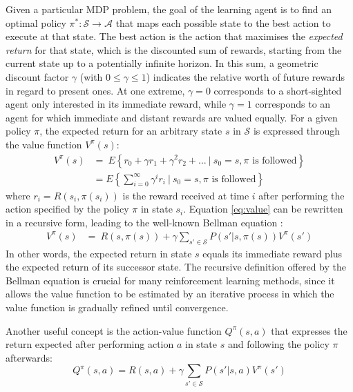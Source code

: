Given a particular MDP problem, the goal of the learning agent is to find an optimal policy $\pi^*: \mathcal{S} \rightarrow \mathcal{A}$ that maps each possible state to the best action to execute at that state.  The best action is the action that maximises the \textit{expected return} for that state, which is the discounted sum of rewards, starting from the current state up to a potentially infinite horizon.  In this sum, a geometric discount factor $\gamma$ (with $0 \leq \gamma \leq 1$) indicates the relative worth of future rewards in regard to present ones. At one extreme, $\gamma = 0$ corresponds to a short-sighted agent only interested in its immediate reward, while $\gamma=1$ corresponds to an agent for which immediate and distant rewards are valued equally. For a given policy $\pi$, the expected return for an arbitrary state $s$ in $\mathcal{S}$ is expressed through the value function $V^{\pi}(s)$:
\begin{align}
V^{\pi}(s) & = \  E \left\{ r_0 + \gamma r_1 + \gamma^2 r_2 + ... \ \big| \ s_0 = s, \pi \text{ is followed} \right\} \\
& = E \left\{\sum_{i=0}^{\infty}  \gamma^i r_{i} \ \bigg| \ s_0 = s, \pi \text{ is followed} \right\} \label{eq:value}
\end{align} 
where $r_i = R(s_i, \pi(s_i))$ is the reward received at time $i$ after performing the action specified by the policy $\pi$  in state $s_i$.  Equation \eqref{eq:value}  can be rewritten in a recursive form, leading to the well-known Bellman equation \citep{Bellman:1957}:
\begin{align}
V^{\pi}(s) & = \    R(s, \pi(s)) + \gamma  \sum_{s' \in \mathcal{S}} P(s'|s,\pi(s)) V^{\pi}(s') \label{eq:bellman}
\end{align} 
In other words, the expected return in state $s$ equals its immediate reward plus the expected return of its successor state.  The recursive definition offered by the Bellman equation is crucial for many reinforcement learning methods, since it allows the value function to be estimated by an iterative process in which the value function is gradually refined until convergence.

Another useful concept is the action-value function $Q^{\pi}(s,a)$ that expresses the return expected after performing action $a$ in state $s$ and following the policy $\pi$ afterwards:
\begin{equation}
Q^{\pi}(s,a) = R(s,a) + \gamma  \sum_{s' \in \mathcal{S}} P(s'|s,a) V^{\pi}(s')
\end{equation}

